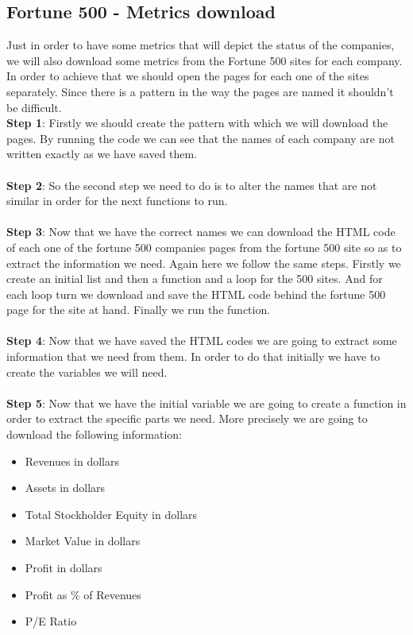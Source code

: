 \documentclass{book}
\begin{document}
\subsection{Fortune 500 - Metrics download}
Just in order to have some metrics that will depict the status of the companies, we will also download some metrics from the Fortune 500 sites for each company.\cite{key35} In order to achieve that we should open the pages for each one of the sites separately. Since there is a pattern in the way the pages are named it shouldn't be difficult.\\
\textbf{Step 1}: Firstly we should create the pattern with which we will download the pages. By running the code we can see that the names of each company are not written exactly as we have saved them.\\\\
\textbf{Step 2}: So the second step we need to do is to alter the names that are not similar in order for the next functions to run.\\\\
\textbf{Step 3}: Now that we have the correct names we can download the HTML code of each one of the fortune 500 companies pages from the fortune 500 site so as to extract the information we need. Again here we follow the same steps. Firstly we create an initial list and then a function and a loop for the 500 sites. And for each loop turn we download and save the HTML code behind the fortune 500 page for the site at hand. Finally we run the function.\\\\
\textbf{Step 4}: Now that we have saved the HTML codes we are going to extract some information that we need from them. In order to do that initially we have to create the variables we will need.\\\\
\textbf{Step 5}: Now that we have the initial variable we are going to create a function in order to extract the specific parts we need. More precisely we are going to download the following information:
\begin{itemize}
\item Revenues in dollars
\item Assets in dollars
\item Total Stockholder Equity in dollars
\item Market Value in dollars
\item Profit in dollars
\item Profit as \% of Revenues
\item P/E Ratio
\end{itemize}
\end{document}
